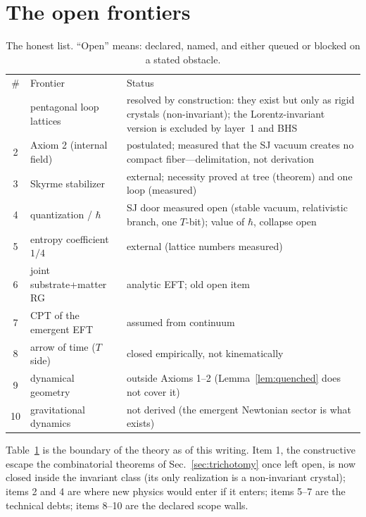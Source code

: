 \documentclass[aps,prd,reprint,nofootinbib,superscriptaddress,floatfix]{revtex4-2}
\theoremstyle{definition}
\begin{document}
\section{The open frontiers}
\label{sec:open}

\begin{table}[t]
\caption{\label{tab:open}The honest list. ``Open'' means: declared, named, and either
queued or blocked on a stated obstacle.}
\begin{ruledtabular}
\begin{tabular}{clp{4.2cm}}
\# & Frontier & Status \\
\colrule
1 & pentagonal loop lattices & resolved by construction: they exist but only as rigid
crystals (non-invariant); the Lorentz-invariant version is excluded by layer~1 and BHS \\
2 & Axiom 2 (internal field) & postulated; measured that the SJ vacuum creates no
compact fiber---delimitation, not derivation \\
3 & Skyrme stabilizer & external; necessity proved at tree (theorem) and one loop
(measured) \\
4 & quantization / $\hbar$ & SJ door measured open (stable vacuum, relativistic branch,
one $T$-bit); value of $\hbar$, collapse open \\
5 & entropy coefficient $1/4$ & external (lattice numbers measured) \\
6 & joint substrate+matter RG & analytic EFT; old open item \\
7 & CPT of the emergent EFT & assumed from continuum \\
8 & arrow of time ($T$ side) & closed empirically, not kinematically \\
9 & dynamical geometry & outside Axioms 1--2 (Lemma~\ref{lem:quenched} does not
cover it) \\
10 & gravitational dynamics & not derived (the emergent Newtonian sector is what
exists) \\
\end{tabular}
\end{ruledtabular}
\end{table}

Table~\ref{tab:open} is the boundary of the theory as of this writing. Item 1, the
constructive escape the combinatorial theorems of Sec.~\ref{sec:trichotomy} once left
open, is now closed inside the invariant class (its only realization is a non-invariant
crystal); items 2 and 4 are where new physics would enter if it enters; items 5--7 are
the technical debts; items 8--10 are the declared scope walls.
\end{document}
